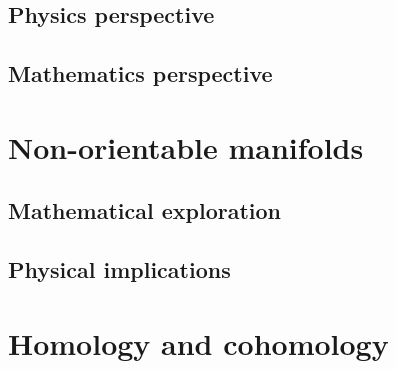\documentclass[11pt,a4paper]{report}
\theoremstyle{definition}
\theoremstyle{remark}
\newcommand{\?}{\stackrel{?}{=}}
\begin{document}
\section{Physics perspective}

\section{Mathematics perspective}


\chapter{Non-orientable manifolds}

\section{Mathematical exploration}

\section{Physical implications}

\appendix 
{}

\chapter{Homology and cohomology}

\printbibliography
	
	
\end{document}
